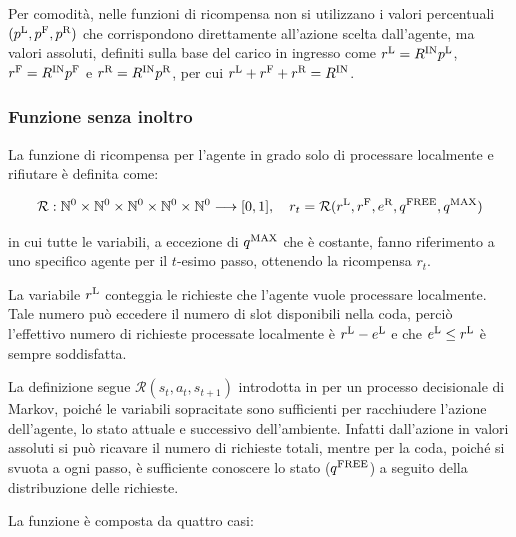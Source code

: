 Per comodità, nelle funzioni di ricompensa non si utilizzano i valori percentuali $(p^\textnormal{L}, p^\textnormal{F}, p^\textnormal{R})$ che corrispondono direttamente all'azione scelta dall'agente, ma valori assoluti, definiti sulla base del carico in ingresso come $r^\textnormal{L} = R^\textnormal{IN} p^\textnormal{L}$, $r^\textnormal{F} = R^\textnormal{IN} p^\textnormal{F}$ e $r^\textnormal{R} = R^\textnormal{IN} p^\textnormal{R}$, per cui $r^\textnormal{L} + r^\textnormal{F} + r^\textnormal{R} = R^\textnormal{IN}$.

\subsubsection{Funzione senza inoltro}
\label{sec:4_reward_no_fw}

La funzione di ricompensa per l'agente in grado solo di processare localmente e rifiutare è definita come:

\begin{equation}
    \mathcal{R}: \mathbb{N}^0 \times \mathbb{N}^0 \times \mathbb{N}^0 \times \mathbb{N}^0 \times \mathbb{N}^0 \longrightarrow [0, 1], \quad 
    r_t = \mathcal{R}(r^\textnormal{L}, r^\textnormal{F}, e^\textnormal{R}, q^\textnormal{FREE}, q^\textnormal{MAX})
\end{equation}

in cui tutte le variabili, a eccezione di $q^\textnormal{MAX}$ che è costante, fanno riferimento a uno specifico agente per il $t$-esimo passo, ottenendo la ricompensa $r_t$.

La variabile $r^\textnormal{L}$ conteggia le richieste che l'agente vuole processare localmente. Tale numero può eccedere il numero di slot disponibili nella coda, perciò l'effettivo numero di richieste processate localmente è $r^\textnormal{L} - e^\textnormal{L}$ e che $e^\textnormal{L} \le r^\textnormal{L}$ è sempre soddisfatta.

La definizione segue $\mathcal{R}(s_t, a_t, s_{t+1})$ introdotta in  per un processo decisionale di Markov, poiché le variabili sopracitate sono sufficienti per racchiudere l'azione dell'agente, lo stato attuale e successivo dell'ambiente. Infatti dall'azione in valori assoluti si può ricavare il numero di richieste totali, mentre per la coda, poiché si svuota a ogni passo, è sufficiente conoscere lo stato ($q^\textnormal{FREE}$) a seguito della distribuzione delle richieste.

La funzione è composta da quattro casi:


